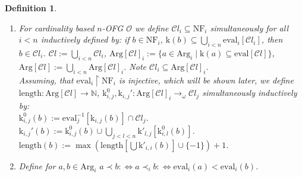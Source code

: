 \documentclass[10pt]{article}
\def \ssubitem#1{\item \label{\actlabel#1} }
\newtheorem {definition} [lemma]{Definition}
\def\ar{\rightarrow}
\def \Iff{\Leftrightarrow}
\def \calO{{\mathcal O}}
\def\nat{\mathbb{N}}
\def\length{\mathrm{length}}
\def\Arg{\mathrm{Arg}}
\def\k{\mathrm{k}}
\def\Cl{{\mathcal{C}l}}
\def\eval{\mathrm{eval}}
\def\NF{\mathrm{NF}}
\begin{document}
\begin{definition}
{\begin{enumerate}
\ssubitem f 
For cardinality based $n$-OFG $\calO$ we define
$\Cl_{i}\subseteq \NF_i$ simultaneously for 
all $i< n$ inductively defined by:
if $b \in \NF_i$, $\k(b) \subseteq \bigcup_{i<n}\eval_i[\Cl_i]$, 
then $b \in \Cl_i$. $\Cl:= \bigcup_{i<n}\Cl_i$,
$\Arg[\Cl]_i:= \{ a \in \Arg_i \mid\k(a) \subseteq \eval[\Cl]\} $,
$\Arg[\Cl]:= \bigcup_{i<n}\Arg[\Cl]_i$. Note
$\Cl_i \subseteq \Arg[\Cl]_i$.\\
Assuming, that $\eval_i \restriction \NF_i$ is
injective, which will be shown later, we define
$\length: \Arg[\Cl] \ar \nat$,
$\k_{i,j}^0,\k_{i,j}': \Arg[\Cl]_i \ar_\omega \Cl_{j}$ 
simultaneously inductively
by:\\
$\k_{i,j}^0(b):= \eval_j^{-1}[\k_{i,j}(b)] \cap \Cl_j$.
$\k_{i,j}'(b):= \k^0_{i,j}(b) \cup
\bigcup_{j< l<n}\k'_{l,j}[\k^0_{i,l}(b)]$.\\
$\length(b):= \max(\length[\bigcup\k'_{i,i}(b)] \cup \{ -1 \})+1$.
\ssubitem g Define for $a,b \in \Arg_i$
$a \prec b :\Iff a \prec_i b :\Iff \eval_i (a) < \eval_i(b)$.
\end{enumerate}}
\end{definition}
%
%
%
\end{document}

